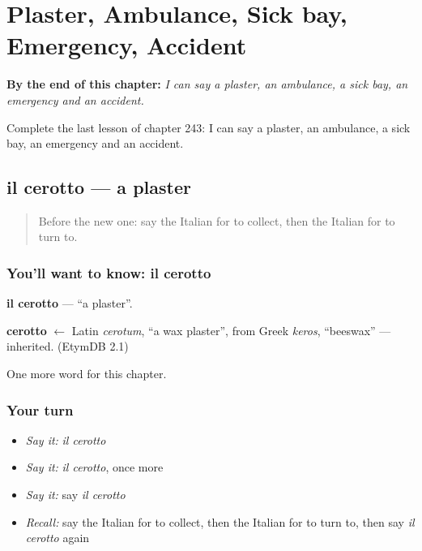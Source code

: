 
\chapter{Plaster, Ambulance, Sick bay, Emergency, Accident}
\label{ch:it-plaster-ambulance-sick-bay-emergency-accident}

\begin{chapteropening}
\textbf{By the end of this chapter:} \emph{I can say a plaster, an ambulance, a sick bay, an emergency and an accident.}

Complete the last lesson of chapter 243: I can say a plaster, an ambulance, a sick bay, an emergency and an accident.
\end{chapteropening}

\section[il cerotto]{il cerotto — a plaster}

\label{lesson:IT-C243-cerotto}



\begin{quote}
Before the new one: say the Italian for to collect, then the Italian for to turn to.
\end{quote}

\subsection*{You'll want to know: il cerotto}
\textbf{il cerotto} — \textquotedblleft{}a plaster\textquotedblright{}.

\begin{cousinweb}
\textbf{cerotto} $\leftarrow$ Latin \emph{cerotum}, \textquotedblleft{}a wax plaster\textquotedblright{}, from Greek \emph{keros}, \textquotedblleft{}beeswax\textquotedblright{} — inherited. (EtymDB 2.1)
\end{cousinweb}

\begin{grammarlens}[title={What you've built}]
One more word for this chapter.
\end{grammarlens}

\subsection*{Your turn}
\begin{itemize}
\raggedright
  \item \emph{Say it:} \emph{il cerotto}
  \item \emph{Say it:} \emph{il cerotto}, once more
  \item \emph{Say it:} say \emph{il cerotto}
  \item \emph{Recall:} say the Italian for to collect, then the Italian for to turn to, then say \emph{il cerotto} again
\end{itemize}

